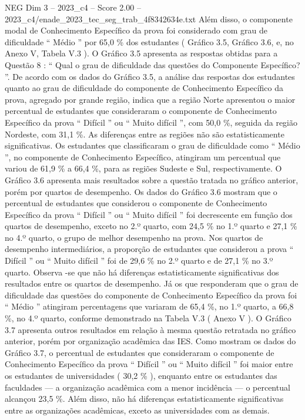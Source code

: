\begin{textsample}{NEG Dim 3 – 2023\_c4 – Score 2.00 – 2023\_c4/enade\_2023\_tec\_seg\_trab\_4f8342634e.txt}
Além disso, o componente modal de Conhecimento Específico da prova foi considerado com grau de dificuldade “ Médio ” por 65,0 \% dos estudantes ( Gráfico 3.5, Gráfico 3.6, e, no Anexo V, Tabela V.3 ).
O Gráfico 3.5 apresenta as respostas obtidas para a Questão 8 : “ Qual o grau de dificuldade das questões do Componente Específico? ”.
De acordo com os dados do Gráfico 3.5, a análise das respostas dos estudantes quanto ao grau de dificuldade do componente de Conhecimento Específico da prova, agregado por grande região, indica que a região Norte apresentou o maior percentual de estudantes que consideraram o componente de Conhecimento Específico da prova “ Difícil ” ou “ Muito difícil ”, com 50,0 \%, seguida da região Nordeste, com 31,1 \%.
As diferenças entre as regiões não são estatisticamente significativas.
Os estudantes que classificaram o grau de dificuldade como “ Médio ”, no componente de Conhecimento Específico, atingiram um percentual que variou de 61,9 \% a 66,4 \%, para as regiões Sudeste e Sul, respectivamente.
O Gráfico 3.6 apresenta mais resultados sobre a questão tratada no gráfico anterior, porém por quartos de desempenho.
Os dados do Gráfico 3.6 mostram que o percentual de estudantes que considerou o componente de Conhecimento Específico da prova “ Difícil ” ou “ Muito difícil ” foi decrescente em função dos quartos de desempenho, exceto no 2.º quarto, com 24,5 \% no 1.º quarto e 27,1 \% no 4.º quarto, o grupo de melhor desempenho na prova.
Nos quartos de desempenho intermediários, a proporção de estudantes que considerou a prova “ Difícil ” ou “ Muito difícil ” foi de 29,6 \% no 2.º quarto e de 27,1 \% no 3.º quarto.
Observa -se que não há diferenças estatisticamente significativas dos resultados entre os quartos de desempenho.
Já os que responderam que o grau de dificuldade das questões do componente de Conhecimento Específico da prova foi “ Médio ” atingiram percentagens que variaram de 65,4 \%, no 1.º quarto, a 66,8 \%, no 4.º quarto, conforme demonstrado na Tabela V.3 ( Anexo V ).
O Gráfico 3.7 apresenta outros resultados em relação à mesma questão retratada no gráfico anterior, porém por organização acadêmica das IES.
Como mostram os dados do Gráfico 3.7, o percentual de estudantes que consideraram o componente de Conhecimento Específico da prova “ Difícil ” ou “ Muito difícil ” foi maior entre os estudantes de universidades ( 30,2 \% ), enquanto entre os estudantes das faculdades — a organização acadêmica com a menor incidência — o percentual alcançou 23,5 \%.
Além disso, não há diferenças estatisticamente significativas entre as organizações acadêmicas, exceto as universidades com as demais.

\end{textsample}
